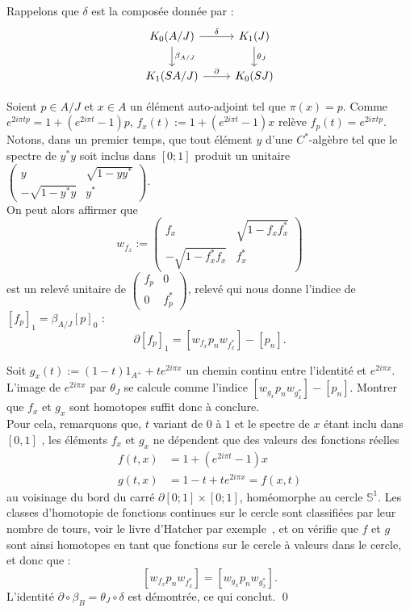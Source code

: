 \begin{dem}
Rappelons que $\delta$ est la composée donnée par :
\[
\begin{tikzcd}
K_0(A/J)  \arrow{r}{\delta}\arrow{d}{\beta_{A/J}}	& K_1(J) \arrow{d}{\theta_J} \\
K_1(S A/J) \arrow{r}{\partial} 	& K_0(SJ)
\end{tikzcd}
\]

Soient $p\in A/J$ et $x \in A$ un élément auto-adjoint tel que $\pi(x)=p$. Comme $e^{2i\pi tp}=1+(e^{2i\pi t}-1)p$, $f_x(t):=1+(e^{2i\pi t}-1)x$ relève $f_p(t)=e^{2i\pi tp}$. \\

Notons, dans un premier temps, que tout élément $y$ d'une $C^*$-algèbre tel que le spectre de $y^*y$ soit inclus dans $[0;1]$ produit un unitaire $\begin{pmatrix} y & \sqrt{1-yy^*}\\ -\sqrt{1-y^*y} & y^* \end{pmatrix}$. \\
On peut alors affirmer que 
\[w_{f_x}:=\begin{pmatrix} f_x & \sqrt{1-f_xf_x^*}\\ -\sqrt{1-f_x^*f_x} & f^*_x \end{pmatrix}\]
est un relevé unitaire de $\begin{pmatrix}f_p & 0\\ 0 & f_p^*\end{pmatrix}$, relevé qui nous donne l'indice de $[f_p]_1=\beta_{A/J}[p]_0$ :  
\[\partial [f_p]_1= [w_{f_x} p_n w_{f_x^*}]-[p_n].\]

Soit $g_x(t):=(1-t)1_{A^+}+t e^{2i \pi x}$ un chemin continu entre l'identité et $e^{2i\pi x}$. L'image de $e^{2i\pi x}$ par $\theta_J$ se calcule comme l'indice $[w_{g_x} p_n w_{g^*_x}]-[p_n]$. Montrer que $f_x$ et $g_x$ sont homotopes suffit donc à conclure. \\

Pour cela, remarquons que, $t$ variant de $0$ à $1$ et le spectre de $x$ étant inclu dans $[0,1]$ %
, les éléments $f_x$ et $g_x$ ne dépendent que des valeurs des fonctions réelles
\[\begin{array}{rl}f(t,x) &=1+(e^{2i\pi t}-1)x \\
g(t,x) &=1-t+te^{2i\pi x}=f(x,t)\end{array}\]
au voisinage du bord du carré $\partial [0;1]\times [0;1]$, homéomorphe au cercle $\mathbb S^1$. Les classes d'homotopie de fonctions continues sur le cercle sont classifiées par leur nombre de tours, voir le livre d'Hatcher par exemple~\cite{Hatcher}, et on vérifie que $f$ et $g$ sont ainsi homotopes en tant que fonctions sur le cercle à valeurs dans le cercle, et donc que :
\[[w_{f_x} p_n w_{f_x^*}]=[w_{g_x} p_n w_{g^*_x}].\]
L'identité $\partial \circ \beta_B= \theta_J\circ \delta$ est démontrée, ce qui conclut.
\qed
\end{dem}


